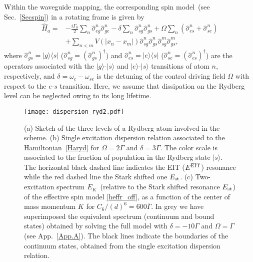 \documentclass[pra,twocolumn,showpacs,preprintnumbers,amsmath,amssymb]{revtex4-1}
\begin{document}
Within the waveguide mapping, the corresponding spin model~(see  Sec.~\ref{Secspin}) in a rotating frame is given by
\begin{equation}\label{Haryd}
\begin{split}
\hat H_a=&-\frac{i\Gamma_0}{2}\sum_n\hat\sigma_{eg}^n\hat\sigma_{ge}^n -\delta\sum_n \hat\sigma^n_{sg}\hat\sigma^n_{gs}+\Omega\sum_n\left(\hat\sigma_{es}^n+\hat\sigma_{se}^n\right)\\
&+\sum_{n<m}V(|x_n-x_m|)\hat\sigma^n_{sg}\hat\sigma^n_{gs}\hat\sigma^m_{sg}\hat\sigma^m_{gs},
\end{split}
\end{equation}
where $\hat\sigma^n_{gs}=|g\rangle\langle s|$ ($\hat\sigma^n_{sg}=(\hat\sigma^n_{gs})^\dagger$) and $\hat\sigma^n_{es}=|e\rangle\langle s|$ ($\hat\sigma^n_{se}=(\hat\sigma^n_{es})^\dagger$)  are the operators associated with the $|g\rangle$-$|s \rangle$ and $|e\rangle$-$|s \rangle$ transitions of atom $n$, respectively, and $\delta=\omega_c-\omega_{se}$ is the detuning of the control driving field $\Omega$ with respect to the $e$-$s$ transition. Here, we assume that dissipation on the Rydberg level can be neglected owing to its long lifetime.
\begin{figure}
\texttt{[image: dispersion\_ryd2.pdf]}%
\caption{(a) Sketch of the three levels of a Rydberg atom involved in the scheme. (b) Single excitation dispersion relation associated to the Hamiltonian~\eqref{Haryd} for  $\Omega=2\Gamma$ and  $\delta=3\Gamma$. The color scale is associated to the fraction of population in the Rydberg state $|s\rangle$. The horizontal black dashed line indicates the EIT ($E^{\rm EIT}$) resonance while the red dashed line the Stark shifted one $E_{\rm st}$. (c) Two-excitation spectrum $E_K$~(relative to the Stark shifted resonance $E_{\rm st}$) of the effective spin model \eqref{heffr_off}, as a function of the center of mass momentum $K$ for $C_6/(d)^6=600\bar\Gamma$. In grey we have superimposed the equivalent spectrum (continuum and bound states) obtained by solving the full model with $\delta=-10\Gamma$ and $\Omega=\Gamma$ (see App.~\ref{App.A}). The black lines indicate the boundaries of the continuum states, obtained from the single excitation dispersion relation.}
\label{Fig.Rtran}
\end{figure}
\end{document}
